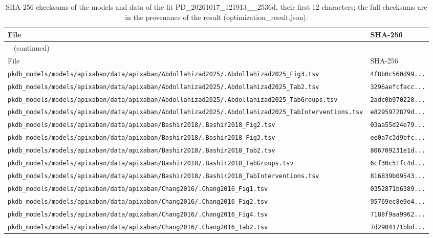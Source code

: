 \documentclass{article}
\begin{document}
\begin{longtable}{ll}
\caption{SHA-256 checksums of the models and data of the fit PD\_20261017\_121913\_\_2536d, their first 12 characters; the full checksums are in the provenance of the result (optimization\_result.json).}\label{tab:checksums:PD_20261017_121913__2536d} \\
\toprule
File & SHA-256 \\
\midrule
\endfirsthead
\multicolumn{2}{l}{\small\tablename~\thetable{} (continued)} \\
\toprule
File & SHA-256 \\
\midrule
\endhead
\bottomrule
\endlastfoot
\texttt{pkdb\_models/models/apixaban/data/apixaban/Abdollahizad2025/.Abdollahizad2025\_Fig3.tsv} & \texttt{4f8b0c560d99...} \\
\texttt{pkdb\_models/models/apixaban/data/apixaban/Abdollahizad2025/.Abdollahizad2025\_Tab2.tsv} & \texttt{3296aefcfacc...} \\
\texttt{pkdb\_models/models/apixaban/data/apixaban/Abdollahizad2025/.Abdollahizad2025\_TabGroups.tsv} & \texttt{2adc0b970228...} \\
\texttt{pkdb\_models/models/apixaban/data/apixaban/Abdollahizad2025/.Abdollahizad2025\_TabInterventions.tsv} & \texttt{e8295972879d...} \\
\texttt{pkdb\_models/models/apixaban/data/apixaban/Bashir2018/.Bashir2018\_Fig2.tsv} & \texttt{03aa55d24e79...} \\
\texttt{pkdb\_models/models/apixaban/data/apixaban/Bashir2018/.Bashir2018\_Fig3.tsv} & \texttt{ee0a7c3d9bfc...} \\
\texttt{pkdb\_models/models/apixaban/data/apixaban/Bashir2018/.Bashir2018\_Tab2.tsv} & \texttt{806709231e1d...} \\
\texttt{pkdb\_models/models/apixaban/data/apixaban/Bashir2018/.Bashir2018\_TabGroups.tsv} & \texttt{6cf30c51fc4d...} \\
\texttt{pkdb\_models/models/apixaban/data/apixaban/Bashir2018/.Bashir2018\_TabInterventions.tsv} & \texttt{816839b09543...} \\
\texttt{pkdb\_models/models/apixaban/data/apixaban/Chang2016/.Chang2016\_Fig1.tsv} & \texttt{0352871b6389...} \\
\texttt{pkdb\_models/models/apixaban/data/apixaban/Chang2016/.Chang2016\_Fig2.tsv} & \texttt{95769ec8e9e4...} \\
\texttt{pkdb\_models/models/apixaban/data/apixaban/Chang2016/.Chang2016\_Fig4.tsv} & \texttt{7188f9aa9962...} \\
\texttt{pkdb\_models/models/apixaban/data/apixaban/Chang2016/.Chang2016\_Tab2.tsv} & \texttt{7d2904171bbd...} \\

\end{longtable}
\end{document}
